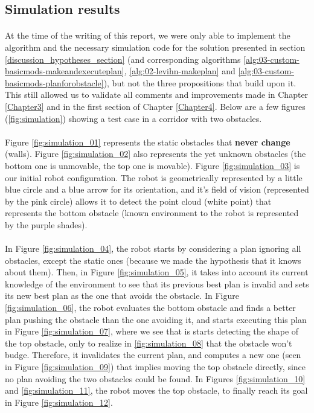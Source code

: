 \subsection{Simulation results}

\paragraph{} At the time of the writing of this report, we were only able to implement the algorithm and the necessary simulation code for the solution presented in section \ref{discussion_hypotheses_section} (and corresponding algorithms \ref{alg:03-custom-basicmods-makeandexecuteplan}, \ref{alg:02-levihn-makeplan} and \ref{alg:03-custom-basicmods-planforobstacle}), but not the three propositions that build upon it. This still allowed us to validate all comments and improvements made in Chapter \ref{Chapter3} and in the first section of Chapter \ref{Chapter4}. Below are a few figures (\ref{fig:simulation}) showing a test case in a corridor with two obstacles.

\paragraph{} Figure \ref{fig:simulation_01} represents the static obstacles that \textbf{never change} (walls). Figure \ref{fig:simulation_02} also represents the yet unknown obstacles (the bottom one is unmovable, the top one is movable). Figure \ref{fig:simulation_03} is our initial robot configuration. The robot is geometrically represented by a little blue circle and a blue arrow for its orientation, and it's field of vision (represented by the pink circle) allows it to detect the point cloud (white point) that represents the bottom obstacle (known environment to the robot is represented by the purple shades).

\paragraph{} In Figure \ref{fig:simulation_04}, the robot starts by considering a plan ignoring all obstacles, except the static ones (because we made the hypothesis that it knows about them). Then, in Figure \ref{fig:simulation_05}, it takes into account its current knowledge of the environment to see that its previous best plan is invalid and sets its new best plan as the one that avoids the obstacle. In Figure \ref{fig:simulation_06}, the robot evaluates the bottom obstacle and finds a better plan pushing the obstacle than the one avoiding it, and starts executing this plan in Figure \ref{fig:simulation_07}, where we see that is starts detecting the shape of the top obstacle, only to realize in \ref{fig:simulation_08} that the obstacle won't budge. Therefore, it invalidates the current plan, and computes a new one (seen in Figure \ref{fig:simulation_09}) that implies moving the top obstacle directly, since no plan avoiding the two obstacles could be found. In Figures \ref{fig:simulation_10} and \ref{fig:simulation_11}, the robot moves the top obstacle, to finally reach its goal in Figure \ref{fig:simulation_12}.

